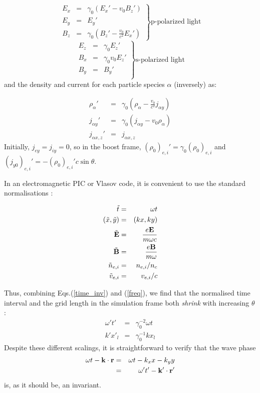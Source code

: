 \documentclass[11pt]{article}
\def\bea{\begin{eqnarray}}
\def\eea{\end{eqnarray}}
\begin{document}
\begin{equation}
\left. \begin{array}{rcl} 
E_x & = & \gamma_0(E_x' - v_0B_z')  \\
E_y & = & E_y'  \\
\displaystyle B_z & = & \gamma_0(B_z' - \frac{v_0}{c^2}E_x')
\end{array} \right\}  \mbox{p-polarized light}
\end{equation}
\begin{equation}
\left. \begin{array}{rcl}
E_z & = & \gamma_0 E_z'  \\
B_x & = & \gamma_0v_0E_z'\\
B_y & = & B_y'\label{fields} \\
\end{array} \right\} \mbox{s-polarized light}
 \end{equation}
and the density and current for each particle species $\alpha$ (inversely) as:

\bea
\rho_\alpha' & = & \gamma_0(\rho_\alpha - \frac{v_0}{c^2}j_{\alpha y}) \nonumber \\
j_{\alpha y}' & = & \gamma_0(j_{\alpha y} - v_0\rho_\alpha)\\
j_{\alpha x,z}' & = & j_{\alpha x,z} \nonumber
\eea
Initially, $j_{ey} = j_{iy} = 0$, so in the boost frame, $(\rho_0)_{e,i}' = \gamma_0(\rho_0)_{e,i}$ and $(j_{y0})_{e,i}' = -(\rho_0)_{e,i}'c\sin\theta$.

In an electromagnetic PIC or Vlasov code, it is convenient to use the standard normalisations \cite{birdsall:book}:

\bea
\tilde{t} & = & \omega t \nonumber \\
(\tilde{x},\tilde{y}) & = & (kx, ky) \nonumber \\
\tilde{{\bf E}} & = & \frac{e{\bf E}}{m\omega c} \nonumber \\
\tilde{{\bf B}} & = & \frac{e{\bf B}}{m\omega} \\
\tilde{n}_{e,i} & = & n_{e,i}/n_c \nonumber \\
\tilde{v}_{e,i} & = & v_{e,i}/c \nonumber
\eea

Thus, combining Eqs.(\ref{time_inv}) and (\ref{freq}), we find that the normalised time interval and the grid length in the simulation frame both {\em shrink} with increasing $\theta$:
\bea 
\omega 't' &=& \gamma_0^{-2}\omega t  \nonumber \\ 
k'x'_l &=& \gamma_0^{-1}kx_l
\eea
Despite these different scalings, it is straightforward to verify that the wave phase
\bea 
\omega t - {\bf k}\cdot {\bf r} &=& \omega t - k_xx - k_yy \nonumber \\
&=& \omega't' - {\bf k}'\cdot {\bf r}' 
\eea
is, as it should be, an invariant.
\end{document}
